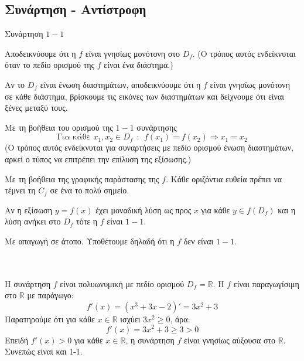 \subsection{Συνάρτηση  - Αντίστροφη}
\begin{askhsh}{Συνάρτηση $ 1-1 $}
\tropoi\begin{tropos}
\item Αποδεικνύουμε ότι η $ f $ είναι γνησίως μονότονη στο $ D_f $. (Ο τρόπος αυτός ενδείκνυται όταν το πεδίο ορισμού της $ f $ είναι ένα διάστημα.)
\item Αν το $D_f$ είναι ένωση διαστημάτων, αποδεικνύουμε ότι η $f$ είναι γνησίως μονότονη σε κάθε διάστημα, βρίσκουμε τις εικόνες των διαστημάτων και δείχνουμε ότι είναι ξένες μεταξύ τους.
\item Με τη βοήθεια του ορισμού της $ 1-1 $ συνάρτησης
\[ \textrm{Για κάθε }x_1,x_2\in D_f \ \ : \ \  f(x_1)=f(x_2)\Rightarrow x_1=x_2 \]
(Ο τρόπος αυτός ενδείκνυται για συναρτήσεις με πεδίο ορισμού ένωση διαστημάτων, αρκεί ο τύπος να επιτρέπει την επίλυση της εξίσωσης.)
\item Με τη βοήθεια της γραφικής παράστασης της $ f $. Κάθε οριζόντια ευθεία πρέπει να τέμνει τη $ C_f $ σε ένα το πολύ σημείο.
\item Αν η εξίσωση $ y=f(x) $ έχει μοναδική λύση ως προς $ x $ για κάθε $ y\in f(D_f) $ και η λύση ανήκει στο $ D_f $ τότε η $ f $ είναι $ 1-1 $.
\item Με απαγωγή σε άτοπο. Υποθέτουμε δηλαδή ότι η $ f $ δεν είναι $ 1-1 $.
\end{tropos}
\end{askhsh}
\\\\
\lysh
Η συνάρτηση $f$ είναι πολυωνυμική με πεδίο ορισμού $D_f = \mathbb{R}$. Η $f$ είναι παραγωγίσιμη στο $\mathbb{R}$ με παράγωγο:
\[ f'(x) = (x^3 + 3x - 2)' = 3x^2 + 3 \]
Παρατηρούμε ότι για κάθε $x \in \mathbb{R}$ ισχύει $3x^2 \ge 0$, άρα:
\[ f'(x) = 3x^2 + 3 \ge 3 > 0 \]
Επειδή $f'(x) > 0$ για κάθε $x \in \mathbb{R}$, η συνάρτηση $f$ είναι {γνησίως αύξουσα} στο $\mathbb{R}$. Συνεπώς είναι και {1-1}.\\\\

